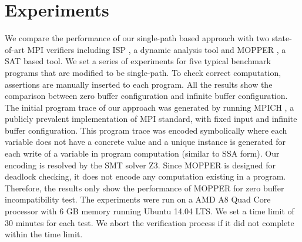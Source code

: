 \section{Experiments}
We compare the performance of our single-path based approach with two state-of-art MPI verifiers including ISP \cite{}, a dynamic analysis tool and MOPPER \cite{}, a SAT based tool. 
We set a series of experiments for five typical benchmark programs that are modified to be single-path. To check correct computation, assertions are manually inserted to each program. All the results show the comparison between zero buffer configuration and infinite buffer configuration. The initial program trace of our approach was generated by running MPICH \cite{mpich}, a publicly prevalent implementation of MPI standard, with fixed input and infinite buffer configuration. This program trace was encoded symbolically where each variable does not have a concrete value and a unique instance is generated for each write of a variable in program computation (similar to SSA form). Our encoding is resolved by the SMT solver Z3. Since MOPPER is designed for deadlock checking, it does not encode any computation existing in a program. Therefore, the results only show the performance of MOPPER for zero buffer incompatibility test. The experiments were run on a AMD A8 Quad Core processor with 6 GB memory running Ubuntu 14.04 LTS. We set a time limit of 30 minutes for each test. We abort the verification process if it did not complete within the time limit. 


